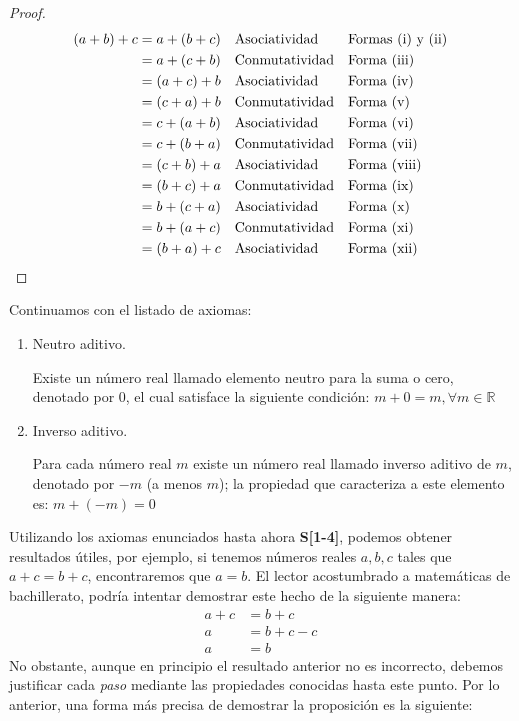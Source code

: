 \documentclass[11pt]{article}
\newcommand{\R}{\mathbb{R}}
\begin{document}
\vspace{-1em}\begin{proof} \begin{align*}
    (a+b)+c &= a+(b+c) && \text{Asociatividad} && \text{Formas (i) y (ii)}\\
    &= a+(c+b) && \text{Conmutatividad} && \text{Forma (iii)}\\
    &= (a+c)+b && \text{Asociatividad} && \text{Forma (iv)}\\
    &= (c+a)+b && \text{Conmutatividad}&& \text{Forma (v)}\\
    &= c+(a+b) && \text{Asociatividad}&& \text{Forma (vi)}\\
    &= c+(b+a) && \text{Conmutatividad}&& \text{Forma (vii)}\\
    &= (c+b)+a && \text{Asociatividad}&& \text{Forma (viii)}\\
    &= (b+c)+a && \text{Conmutatividad}&& \text{Forma (ix)}\\
    &= b+(c+a) && \text{Asociatividad}&& \text{Forma (x)}\\
    &= b+(a+c) && \text{Conmutatividad}&& \text{Forma (xi)}\\
    &= (b+a)+c && \text{Asociatividad}&& \text{Forma (xii)} \qedhere
\end{align*} \end{proof} \vspace{-1em}

Continuamos con el listado de axiomas:

\begin{enumerate}[start=3,label=S\arabic*.]
    \item Neutro aditivo.
    
    Existe un número real llamado elemento neutro para la suma o cero, denotado por $0$, el cual satisface la siguiente condición: $ m+0=m,\forall m \in \R$
    \item Inverso aditivo.
    
    Para cada número real $m$ existe un número real llamado inverso aditivo de $m$, denotado por $-m$ (a menos $m$); la propiedad que caracteriza a este elemento es: $m + (-m) = 0$
\end{enumerate}
\vspace{-1em}
Utilizando los axiomas enunciados hasta ahora \textbf{S[1-4]}, podemos obtener resultados útiles, por ejemplo, si tenemos números reales $a,b,c$ tales que $a+c=b+c$, encontraremos que $a=b$. El lector acostumbrado a matemáticas de bachillerato, podría intentar demostrar este hecho de la siguiente manera: \begin{align*}
    a+c &= b+c\\
    a &= b+c-c\\
    a &= b
\end{align*}
No obstante, aunque en principio el resultado anterior no es incorrecto, debemos justificar cada \textit{paso} mediante las propiedades conocidas hasta este punto. Por lo anterior, una forma más precisa de demostrar la proposición es la siguiente:
\end{document}
